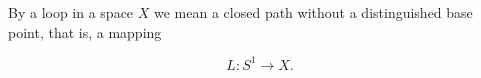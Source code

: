 By a loop in a space $X$ we mean a closed path without a distinguished base point, that is, a mapping

$$L: S^1 \rightarrow X.$$
